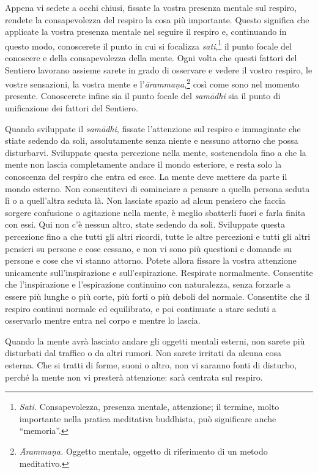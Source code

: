Appena vi sedete a occhi chiusi, fissate la vostra presenza mentale sul
respiro, rendete la consapevolezza del respiro la cosa più importante.
Questo significa che applicate la vostra presenza mentale nel seguire il
respiro e, continuando in questo modo, conoscerete il punto in cui si
focalizza \emph{sati},\footnote{\emph{Sati.} Consapevolezza, presenza
  mentale, attenzione; il termine, molto importante nella pratica
  meditativa buddhista, può significare anche ``memoria''.} il punto
focale del conoscere e della consapevolezza della mente. Ogni volta che
questi fattori del Sentiero lavorano assieme sarete in grado di
osservare e vedere il vostro respiro, le vostre sensazioni, la vostra
mente e l'\emph{ārammaṇa},\footnote{\emph{Ārammaṇa.} Oggetto mentale,
  oggetto di riferimento di un metodo meditativo.} così come sono nel
momento presente. Conoscerete infine sia il punto focale del
\emph{samādhi} sia il punto di unificazione dei fattori del Sentiero.

Quando sviluppate il \emph{samādhi}, fissate l'attenzione sul respiro e
immaginate che stiate sedendo da soli, assolutamente senza niente e
nessuno attorno che possa disturbarvi. Sviluppate questa percezione
nella mente, sostenendola fino a che la mente non lascia completamente
andare il mondo esteriore, e resta solo la conoscenza del respiro che
entra ed esce. La mente deve mettere da parte il mondo esterno. Non
consentitevi di cominciare a pensare a quella persona seduta lì o a
quell'altra seduta là. Non lasciate spazio ad alcun pensiero che faccia
sorgere confusione o agitazione nella mente, è meglio sbatterli fuori e
farla finita con essi. Qui non c'è nessun altro, state sedendo da soli.
Sviluppate questa percezione fino a che tutti gli altri ricordi, tutte
le altre percezioni e tutti gli altri pensieri su persone e cose
cessano, e non vi sono più questioni e domande su persone e cose che vi
stanno attorno. Potete allora fissare la vostra attenzione unicamente
sull'inspirazione e sull'espirazione. Respirate normalmente. Consentite
che l'inspirazione e l'espirazione continuino con naturalezza, senza
forzarle a essere più lunghe o più corte, più forti o più deboli del
normale. Consentite che il respiro continui normale ed equilibrato, e
poi continuate a stare seduti a osservarlo mentre entra nel corpo e
mentre lo lascia.

Quando la mente avrà lasciato andare gli oggetti mentali esterni, non
sarete più disturbati dal traffico o da altri rumori. Non sarete
irritati da alcuna cosa esterna. Che si tratti di forme, suoni o altro,
non vi saranno fonti di disturbo, perché la mente non vi presterà
attenzione: sarà centrata sul respiro.


